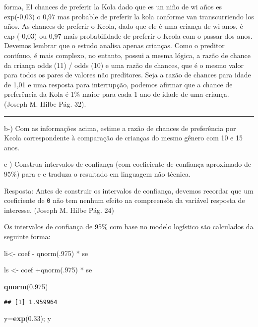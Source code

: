 \documentclass[]{article}
\newenvironment{Shaded}{\begin{snugshade}}{\end{snugshade}}
\newcommand{\FloatTok}[1]{\textcolor[rgb]{0.00,0.00,0.81}{#1}}
\newcommand{\KeywordTok}[1]{\textcolor[rgb]{0.13,0.29,0.53}{\textbf{#1}}}
\newcommand{\NormalTok}[1]{#1}
\begin{document}
forma, El chances de preferir la Kola dado que es un niño de wi años es
exp(-0,03) o 0,97 mas probable de preferir la kola conforme van
transcurriendo los años. As chances de preferir o Kcola, dado que ele é
uma criança de wi anos, é exp (-0,03) ou 0,97 mais probabilidade de
preferir o Kcola com o passar dos anos. Devemos lembrar que o estudo
analisa apenas crianças. Como o preditor contínuo, é mais complexo, no
entanto, possui a mesma lógica, a razão de chance da criança odds (11) /
odds (10) e uma razão de chances, que é o mesmo valor para todos os
pares de valores não preditores. Seja a razão de chances para idade de
1,01 e uma resposta para interrupção, podemos afirmar que a chance de
preferência da Kola é 1\% maior para cada 1 ano de idade de uma criança.
(Joseph M. Hilbe Pág. 32).

\begin{center}\rule{0.5\linewidth}{0.5pt}\end{center}

b-) Com as informações acima, estime a razão de chances de preferência
por Kcola correspondente à comparação de crianças do mesmo gênero com 10
e 15 anos.

c-) Construa intervalos de confiança (com coeficiente de confiança
aproximado de 95\%) para e e traduza o resultado em linguagem não
técnica.

Resposta: Antes de construir os intervalos de confiança, devemos
recordar que um coeficiente de \texttt{0} não tem nenhum efeito na
compreensõa da variável resposta de interesse. (Joseph M. Hilbe Pág. 24)

Os intervalos de confiança de 95\% com base no modelo logístico são
calculados da seguinte forma:

li\textless{}- coef - qnorm(.975) * se

ls \textless{}- coef +qnorm(.975) * se

\begin{Shaded}
\begin{Highlighting}[]
\KeywordTok{qnorm}\NormalTok{(}\FloatTok{0.975}\NormalTok{)}
\end{Highlighting}
\end{Shaded}

\begin{verbatim}
## [1] 1.959964
\end{verbatim}

\begin{Shaded}
\begin{Highlighting}[]
\NormalTok{y=}\KeywordTok{exp}\NormalTok{(}\FloatTok{0.33}\NormalTok{); y}
\end{Highlighting}
\end{Shaded}
\end{document}
